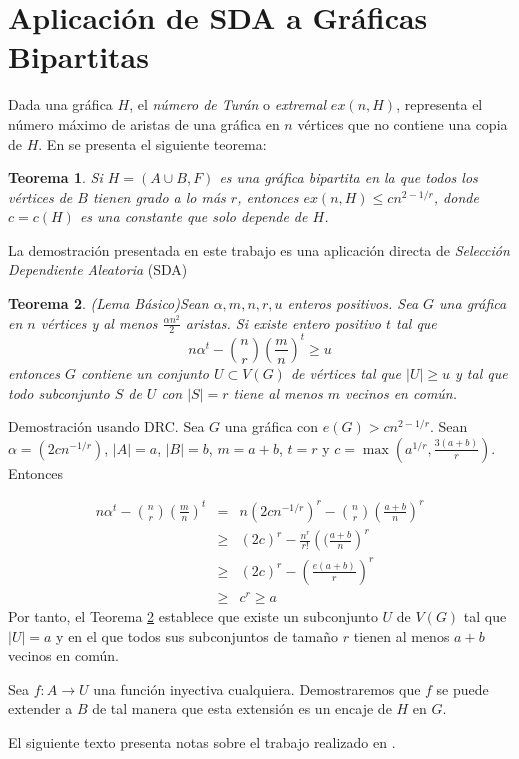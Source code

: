 \documentclass[14pt]{article}
\newtheorem{theorem}{Teorema}
\begin{document}
\section*{Aplicación de SDA a Gráficas Bipartitas}

Dada una gráfica $H$, el \textit{número de Turán} o \textit{extremal}
$ex(n, H)$, representa el número máximo de aristas de una gráfica en
$n$ vértices que no contiene una copia de $H$. En \cite{fox2010drc}
se presenta el siguiente teorema:

\begin{theorem}
  Si $H = (A \cup B, F)$ es una gráfica bipartita en la que todos los
  vértices de $B$ tienen grado
  a lo más $r$, entonces $ex(n, H) \leq c n^{2 - 1 / r}$, donde $c =
  c(H)$ es una constante que solo depende de $H$.
\end{theorem}

La demostración presentada en este trabajo es una aplicación directa
de \textit{Selección Dependiente Aleatoria} (SDA)
\begin{theorem}(Lema Básico)\label{drc}
  Sean $\alpha, m, n, r, u$ enteros positivos. Sea $G$ una gráfica en
  $n$ vértices y al menos $ \frac{\alpha n^2}{2}$ aristas. Si existe
  entero positivo $t$
  tal que
  $$n \alpha^t - \binom{n}{r} \left(\frac{m}{n}\right)^t \geq u$$
  entonces $G$ contiene un conjunto $U \subset V(G)$ de vértices tal que
  $\vert U \vert \geq u$ y tal que todo subconjunto $S$ de $U$ con
  $\vert S \vert = r$
  tiene al menos $m$ vecinos en común.
\end{theorem}
Demostración usando DRC. Sea $G$ una gráfica con $e(G) > c n^{2 -1 /
r}$. Sean $\alpha = (2c n^{-1/r})$,
$\vert A \vert = a$, $\vert B \vert = b$, $m = a + b$, $t = r$
y $c = \max(a^{1/r}, \frac{3(a + b)}{r})$. Entonces

\begin{eqnarray*}
  n \alpha^t - \binom{n}{r} \left(\frac{m}{n}\right)^t &=& n (2c
  n^{-1/r})^r - \binom{n}{r} \left(\frac{a + b}{n}\right)^r\\
  &\geq& (2c)^r - \frac{n^r}{r!} \left((\frac{a + b}{n}\right)^r \\
    &\geq& (2c)^r - \left(\frac{e (a + b)}{r}\right)^r\\
    &\geq& c^r \geq a
  \end{eqnarray*}
  Por tanto, el Teorema \ref{drc} establece que existe un subconjunto
  $U$ de $V(G)$ tal que $\vert U \vert = a$ y en el que todos sus
  subconjuntos de tamaño
  $r$ tienen al menos $a + b$ vecinos en común.

  Sea $f: A \rightarrow U$ una función inyectiva cualquiera.
  Demostraremos que $f$ se puede extender a $B$ de tal manera que
  esta extensión es un encaje de $H$ en $G$.

  El siguiente texto presenta notas sobre el trabajo realizado en
  \cite{furedi1991}.

  
\end{document}
